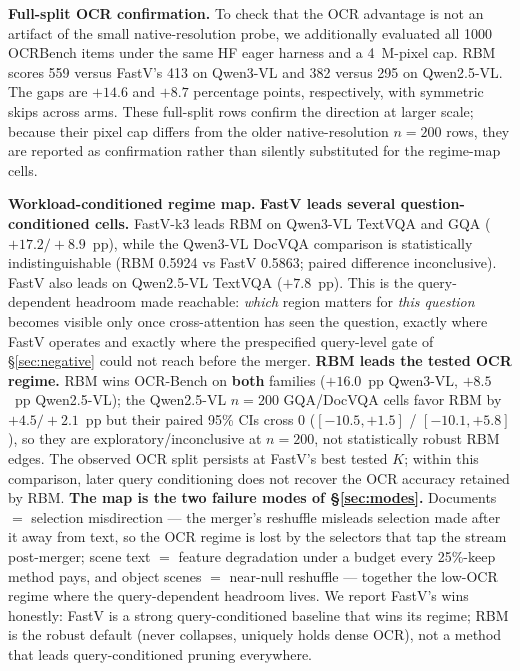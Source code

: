 \documentclass[journal]{IEEEtran}
\begin{document}

\textbf{Full-split OCR confirmation.} To check that the OCR advantage is not
an artifact of the small native-resolution probe, we additionally evaluated
all 1000 OCRBench items under the same HF eager harness and a 4~M-pixel cap.
RBM scores 559 versus FastV's 413 on Qwen3-VL and 382 versus 295 on
Qwen2.5-VL. The gaps are $+14.6$ and $+8.7$ percentage points, respectively,
with symmetric skips across arms. These full-split rows confirm the direction
at larger scale; because their pixel cap differs from the older native-resolution
$n=200$ rows, they are reported as confirmation rather than silently substituted
for the regime-map cells.

\textbf{Workload-conditioned regime map.}
\textbf{FastV leads several question-conditioned cells.} FastV-k3 leads RBM on
Qwen3-VL TextVQA and GQA ($+17.2 / +8.9$~pp), while the Qwen3-VL DocVQA
comparison is statistically indistinguishable (RBM 0.5924 vs FastV 0.5863;
paired difference inconclusive). FastV also leads on Qwen2.5-VL TextVQA
($+7.8$~pp). This is the query-dependent
headroom made reachable: \emph{which} region matters for \emph{this question}
becomes visible only once cross-attention has seen the question, exactly where
FastV operates and exactly where the prespecified query-level gate of
\S\ref{sec:negative} could not reach before the merger. \textbf{RBM leads the
tested OCR regime.} RBM wins OCR-Bench on \textbf{both} families ($+16.0$~pp
Qwen3-VL, $+8.5$~pp Qwen2.5-VL); the Qwen2.5-VL $n = 200$ GQA/DocVQA cells
favor RBM by $+4.5 / +2.1$~pp but their paired 95\% CIs cross 0
($[-10.5, +1.5]$ / $[-10.1, +5.8]$), so they are exploratory/inconclusive at
$n = 200$, not statistically robust RBM edges. The observed OCR split persists
at FastV's best tested $K$; within this comparison, later query conditioning
does not recover the OCR accuracy retained by RBM. \textbf{The map is the two
failure modes of \S\ref{sec:modes}.} Documents $=$ selection misdirection ---
the merger's reshuffle misleads selection made after it away from text, so the
OCR regime is lost by the selectors that tap the stream post-merger; scene text
$=$ feature degradation under a budget every 25\%-keep method pays, and object
scenes $=$ near-null reshuffle --- together the low-OCR regime where the
query-dependent headroom lives. We report FastV's wins honestly: FastV is a
strong query-conditioned baseline that wins its regime; RBM is the robust
default (never collapses, uniquely holds dense OCR), not a method that leads
query-conditioned pruning everywhere.
\end{document}
